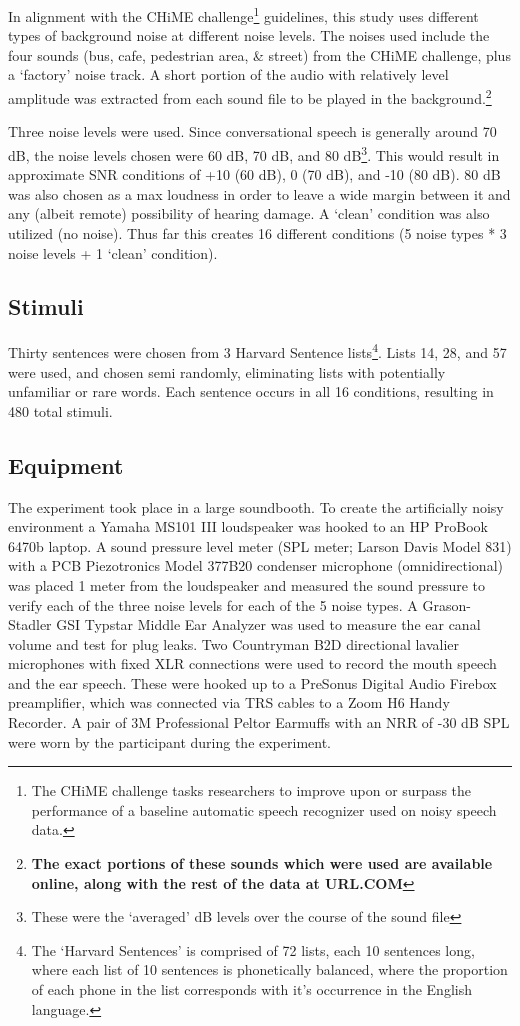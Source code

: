 \documentclass[dissertation,copyright]{uathesis}
\begin{document}
In alignment with the CHiME challenge\footnote{The CHiME challenge tasks researchers to improve upon or surpass the performance of a baseline automatic speech recognizer used on noisy speech data.} guidelines, this study uses different types of background noise at different noise levels.  The noises used include the four sounds (bus, cafe, pedestrian area, \& street) from the CHiME\cite{chime:16} challenge, plus a `factory' noise track.  A short portion of the audio with relatively level amplitude was extracted from each sound file to be played in the background.\footnote{\textbf{The exact portions of these sounds which were used are available online, along with the rest of the data at URL.COM}}

Three noise levels were used.  Since conversational speech is generally around 70 dB, the noise levels chosen were 60 dB, 70 dB, and 80 dB\footnote{These were the `averaged' dB levels over the course of the sound file}.  This would result in approximate SNR conditions of +10 (60 dB), 0 (70 dB), and -10 (80 dB).  80 dB was also chosen as a max loudness in order to leave a wide margin between it and any (albeit remote) possibility of hearing damage. A `clean' condition was also utilized (no noise).  Thus far this creates 16 different conditions (5 noise types * 3 noise levels + 1 `clean' condition).  

\subsection{Stimuli}
Thirty sentences were chosen from 3 Harvard Sentence lists\footnote{The `Harvard Sentences' is comprised of 72 lists, each 10 sentences long, where each list of 10 sentences is phonetically balanced, where the proportion of each phone in the list corresponds with it's occurrence in the English language.\cite{harvardSents}}.  Lists 14, 28, and 57 were used, and chosen semi randomly, eliminating lists with potentially unfamiliar or rare words.  Each sentence occurs in all 16 conditions, resulting in 480 total stimuli.

  
\subsection{Equipment}

The experiment took place in a large soundbooth.  To create the artificially noisy environment a Yamaha MS101 III loudspeaker was hooked to an HP ProBook 6470b laptop.  A sound pressure level meter (SPL meter; Larson Davis Model 831) with a PCB Piezotronics Model 377B20 condenser microphone (omnidirectional) was placed 1 meter from the loudspeaker and measured the sound pressure to verify each of the three noise levels for each of the 5 noise types. A Grason-Stadler GSI Typstar Middle Ear Analyzer was used to measure the ear canal volume and test for plug leaks.  Two Countryman B2D directional lavalier microphones with fixed XLR connections were used to record the mouth speech and the ear speech.  These were hooked up to a PreSonus Digital Audio Firebox preamplifier, which was connected via TRS cables to a Zoom H6 Handy Recorder. A pair of 3M Professional Peltor Earmuffs with an NRR of -30 dB SPL were worn by the participant during the experiment.
\end{document}
